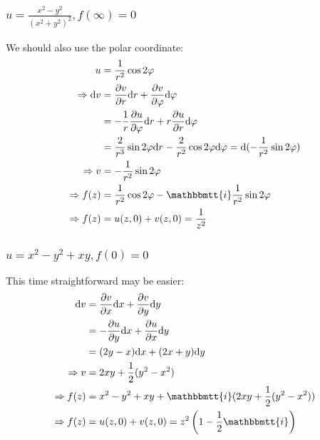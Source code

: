 \documentclass[]{ctexart}
\newcommand{\mi}{\mathbbmtt{i}}
\newcommand{\di}{\mathrm{d}}
\newcommand{\pa}{\partial}
\begin{document}
			\subsubsection{$u=\frac{x^{2}-y^{2}}{\left(x^{2}+y^{2}\right)^{2}}, f(\infty)=0$}
				We should also use the polar coordinate:
				\begin{equation*}
				\begin{aligned}
					u&=\frac{1}{r^2}\cos 2\varphi\\
					\Rightarrow \di v&=\frac{\pa v}{\pa r}\di r+\frac{\pa v}{\pa \varphi}\di \varphi\\
					&=-\frac{1}{r}\frac{\pa u}{\pa \varphi}\di r+r\frac{\pa u}{\pa r}\di \varphi\\
					&=\frac{2}{r^3}\sin 2\varphi\di r-\frac{2}{r^2}\cos 2\varphi\di \varphi=\di(-\frac{1}{r^2}\sin 2\varphi)\\
					\Rightarrow v&=-\frac{1}{r^2}\sin 2\varphi\\
					\Rightarrow f(z)&=\frac{1}{r^2}\cos 2\varphi-\mi \frac{1}{r^2}\sin 2\varphi\\
					\Rightarrow f(z)&=u(z,0)+v(z,0)=\frac{1}{z^2}
				\end{aligned}
				\end{equation*}
			
			\subsubsection{$u=x^{2}-y^{2}+x y, f(0)=0 $}
				This time straightforward may be easier: 
					\begin{equation*}
					\begin{aligned}
						\di v&=\frac{\pa v}{\pa x}\di x+\frac{\pa v}{\pa y}\di y\\
						&=-\frac{\pa u}{\pa y}\di x+\frac{\pa u}{\pa x}\di y\\
						&=(2y-x)\di x+(2x+y)\di y\\
						\Rightarrow v&=2xy+\frac{1}{2}(y^2-x^2)\\
						\Rightarrow f(z)&=x^{2}-y^{2}+x y+\mi (2xy+\frac{1}{2}(y^2-x^2))\\
						\Rightarrow f(z)&=u(z,0)+v(z,0)=z^2\left(1-\frac{1}{2}\mi\right)
					\end{aligned}
					\end{equation*}
		
\end{document}
